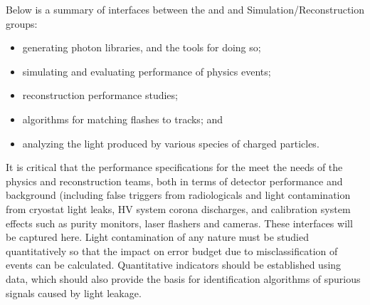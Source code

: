 Below is a summary of interfaces between the \dune \single {} and  and  Simulation/Reconstruction groups:

\begin{itemize}
    \item generating photon libraries, and the tools for doing so;
    \item simulating and evaluating performance of physics events;
    \item \single {} reconstruction performance studies;
    \item algorithms for matching flashes to  tracks; and
    \item analyzing the light produced by various species of charged particles.
\end{itemize}

It is critical that the performance specifications for the  meet the needs of the physics and reconstruction teams, both in terms of detector performance and background (including false triggers from radiologicals and light contamination from cryostat light leaks, HV system corona discharges, and calibration system effects such as purity monitors, laser flashers and cameras.  These interfaces will be captured here.
Light contamination of any nature must be studied quantitatively so that the impact on error budget due to misclassification of events can be calculated. Quantitative indicators should be established using  data, which should also provide the basis for identification algorithms of spurious signals caused by light leakage. 






